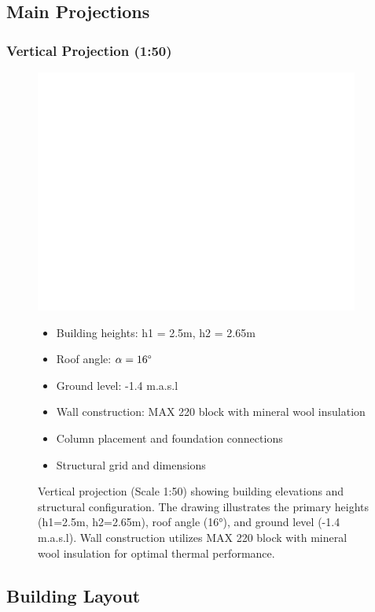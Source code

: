 \documentclass[12pt,a4paper]{article}
\begin{document}
\subsection{Main Projections}
\subsubsection{Vertical Projection (1:50)}
\begin{figure}[H]
    \centering
    \includegraphics[width=0.95\textwidth]{cad_project/exports/screenshots/vertical_projection.png}
    \caption{Vertical projection (Scale 1:50) showing building elevations and structural configuration. 
    The drawing illustrates the primary heights (h1=2.5m, h2=2.65m), roof angle (16°), and ground level (-1.4 m.a.s.l).
    Wall construction utilizes MAX 220 block with mineral wool insulation for optimal thermal performance.}

\begin{itemize}
    \item Building heights: h1 = 2.5m, h2 = 2.65m
    \item Roof angle: $\alpha = 16\degree$
    \item Ground level: -1.4 m.a.s.l
    \item Wall construction: MAX 220 block with mineral wool insulation
    \item Column placement and foundation connections
    \item Structural grid and dimensions
\end{itemize}
    \label{fig:vertical}
\end{figure}

\subsection{Building Layout}
\end{document}

